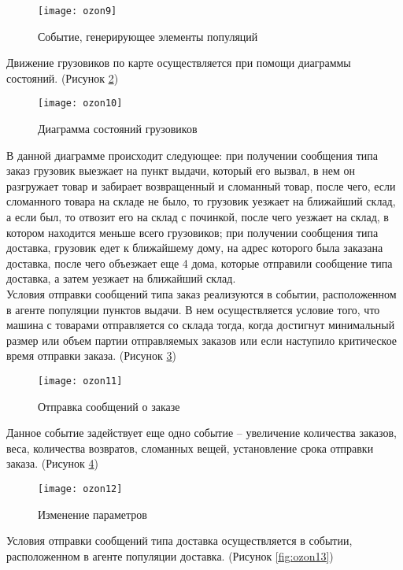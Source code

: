 \begin{figure}[h]
	\centering \texttt{[image: ozon9]}
	\caption{Событие, генерирующее элементы популяций}
	\label{fig:ozon9}
\end{figure}

\newpage

Движение грузовиков по карте осуществляется при помощи диаграммы состояний. (Рисунок \ref{fig:ozon10})
\begin{figure}[h]
	\centering \texttt{[image: ozon10]}
	\caption{Диаграмма состояний грузовиков}
	\label{fig:ozon10}
\end{figure}

В данной диаграмме происходит следующее: при получении сообщения типа заказ грузовик выезжает на пункт выдачи, который его вызвал, в нем он разгружает товар и забирает возвращенный и сломанный товар, после чего, если сломанного товара на складе не было, то грузовик уезжает на ближайший склад, а если был, то отвозит его на склад с починкой, после чего уезжает на склад, в котором находится меньше всего грузовиков; при получении сообщения типа доставка, грузовик едет к ближайшему дому, на адрес которого была заказана доставка, после чего объезжает еще 4 дома, которые отправили сообщение типа доставка, а затем уезжает на ближайший склад.\\

Условия отправки сообщений типа заказ реализуются в событии, расположенном в агенте популяции пунктов выдачи. В нем осуществляется условие того, что машина с товарами отправляется со склада тогда, когда достигнут минимальный размер или объем партии отправляемых заказов или если наступило критическое время отправки заказа. (Рисунок \ref{fig:ozon11})

\newpage

\begin{figure}[h]
	\centering \texttt{[image: ozon11]}
	\caption{Отправка сообщений о заказе}
	\label{fig:ozon11}
\end{figure}

Данное событие задействует еще одно событие – увеличение количества заказов, веса, количества возвратов, сломанных вещей, установление срока отправки заказа. (Рисунок \ref{fig:ozon12})

\begin{figure}[h]
	\centering \texttt{[image: ozon12]}
	\caption{Изменение параметров}
	\label{fig:ozon12}
\end{figure}

Условия отправки сообщений типа доставка осуществляется в событии, расположенном в агенте популяции доставка. (Рисунок \ref{fig:ozon13})

